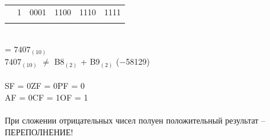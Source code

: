 \documentclass[11pt]{article}
\begin{document}
\begin{paracol}{2}
\begin{enumerate}
\begin{tabular}[t]{cccccc}
			\cline{2-6}
						       &   1     & 0001 & 1100 & 1110 & 1111\\
		\\
		\end{tabular}\\
		= $7407_{(10)}$\\
		\phantom{=} $7407_{(10)}$ $\neq$ B8$_{(2)}$ + B9$_{(2)}$ ($-$58129)\\\\
		SF = 0\qquad ZF = 0\qquad PF = 0 \\
		AF = 0\qquad CF = 1\qquad OF = 1\\\\
		При сложении отрицательных чисел полуен положительный результат -- ПЕРЕПОЛНЕНИЕ!\\\\
		
\end{enumerate}
\end{paracol}
\end{document}
